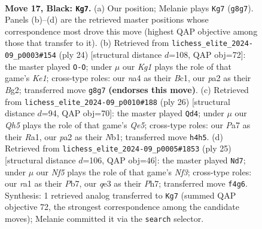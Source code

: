 \documentclass[11pt]{article}
\begin{document}
\clearpage

\begin{figure}[p]\centering
\begin{subfigure}{0.46\textwidth}\centering
\resizebox{\linewidth}{!}{%
\newchessgame
\chessboard[
  setfen={r1br2k1/ppp2p1p/3p4/4b1p1/N1P1Pn1q/3BQ2P/PP3PP1/R1B2R1K b - - 1 17},
  showmover=false,
  pgfstyle=straightmove, color=movearrow, markmove={g8-g7}
]}
\caption{}
\end{subfigure}\hfill
\begin{subfigure}{0.46\textwidth}\centering
\resizebox{\linewidth}{!}{%
\newchessgame
\chessboard[
  setfen={r1b2knr/pp2qp2/3Np1p1/2Ppb2p/3p4/Q5P1/PP2PPBP/R1B1K2R w KQ - 0 13},
  showmover=false,
  pgfstyle=straightmove, color=movearrow, markmove={e1-g1}
]}
\caption{}
\end{subfigure}
\\[4pt]
\begin{subfigure}{0.46\textwidth}\centering
\resizebox{\linewidth}{!}{%
\newchessgame
\chessboard[
  setfen={1k1r1b1r/p1pqn1pp/1p2p3/3pQb2/PP6/2P1B1PP/4PPB1/RN2K2R w KQ - 1 14},
  showmover=false,
  pgfstyle=straightmove, color=movearrow, markmove={e5-d4}
]}
\caption{}
\end{subfigure}\hfill
\begin{subfigure}{0.46\textwidth}\centering
\resizebox{\linewidth}{!}{%
\newchessgame
\chessboard[
  setfen={2kr1b1r/ppp1pppp/4qnb1/4P3/5BP1/2N2Q1P/PPP2P2/R3KB1R b KQ - 0 13},
  showmover=false,
  pgfstyle=straightmove, color=movearrow, markmove={f6-d7}
]}
\caption{}
\end{subfigure}
\caption{\textbf{Move 17, Black: \texttt{Kg7}.} (a) Our position; Melanie plays \texttt{Kg7} (\texttt{g8g7}). Panels (b)--(d) are the retrieved master positions whose correspondence most drove this move (highest QAP objective among those that transfer to it). (b) Retrieved from \texttt{lichess\_elite\_2024-09\_p0003\#154} (ply 24) [structural distance $d$=108, QAP obj=72]: the master played \texttt{O-O}; under $\mu$ our \emph{Kg1} plays the role of that game's \emph{Ke1}; cross-type roles: our \emph{n}a4 as their \emph{B}c1, our \emph{p}a2 as their \emph{B}g2; transferred move \texttt{g8g7} \textbf{(endorses this move)}. (c) Retrieved from \texttt{lichess\_elite\_2024-09\_p0010\#188} (ply 26) [structural distance $d$=94, QAP obj=70]: the master played \texttt{Qd4}; under $\mu$ our \emph{Qh5} plays the role of that game's \emph{Qe5}; cross-type roles: our \emph{P}a7 as their \emph{R}a1, our \emph{p}a2 as their \emph{N}b1; transferred move \texttt{h4h5}. (d) Retrieved from \texttt{lichess\_elite\_2024-09\_p0005\#1853} (ply 25) [structural distance $d$=106, QAP obj=46]: the master played \texttt{Nd7}; under $\mu$ our \emph{Nf5} plays the role of that game's \emph{Nf3}; cross-type roles: our \emph{r}a1 as their \emph{P}b7, our \emph{q}e3 as their \emph{P}h7; transferred move \texttt{f4g6}. Synthesis: 1 retrieved analog transferred to \texttt{Kg7} (summed QAP objective 72, the strongest correspondence among the candidate moves); Melanie committed it via the \texttt{search} selector.}
\label{fig:thought-m33}
\end{figure}
\end{document}

